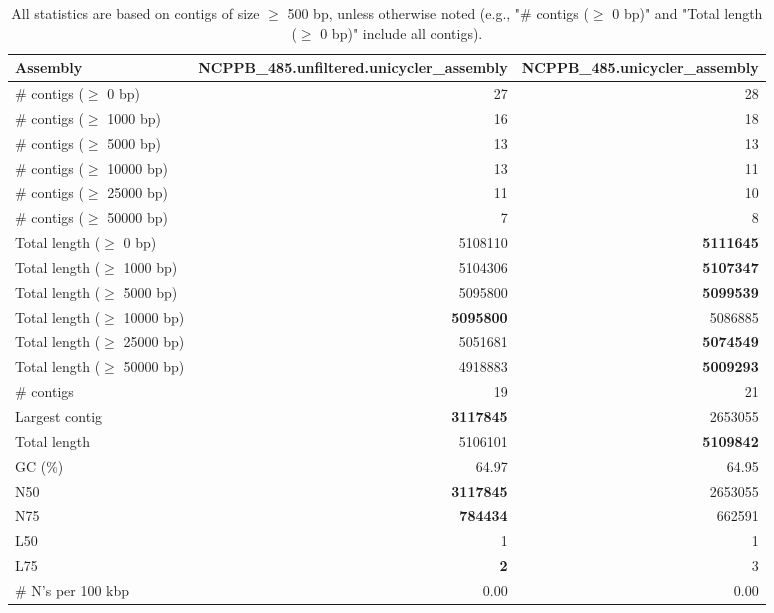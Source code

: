 \documentclass[12pt,a4paper]{article}
\begin{document}
\begin{table}[ht]
\begin{center}
\caption{All statistics are based on contigs of size $\geq$ 500 bp, unless otherwise noted (e.g., "\# contigs ($\geq$ 0 bp)" and "Total length ($\geq$ 0 bp)" include all contigs).}
\begin{tabular}{|l*{2}{|r}|}
\hline
Assembly & NCPPB\_485.unfiltered.unicycler\_assembly & NCPPB\_485.unicycler\_assembly \\ \hline
\# contigs ($\geq$ 0 bp) & 27 & 28 \\ \hline
\# contigs ($\geq$ 1000 bp) & 16 & 18 \\ \hline
\# contigs ($\geq$ 5000 bp) & 13 & 13 \\ \hline
\# contigs ($\geq$ 10000 bp) & 13 & 11 \\ \hline
\# contigs ($\geq$ 25000 bp) & 11 & 10 \\ \hline
\# contigs ($\geq$ 50000 bp) & 7 & 8 \\ \hline
Total length ($\geq$ 0 bp) & 5108110 & {\bf 5111645} \\ \hline
Total length ($\geq$ 1000 bp) & 5104306 & {\bf 5107347} \\ \hline
Total length ($\geq$ 5000 bp) & 5095800 & {\bf 5099539} \\ \hline
Total length ($\geq$ 10000 bp) & {\bf 5095800} & 5086885 \\ \hline
Total length ($\geq$ 25000 bp) & 5051681 & {\bf 5074549} \\ \hline
Total length ($\geq$ 50000 bp) & 4918883 & {\bf 5009293} \\ \hline
\# contigs & 19 & 21 \\ \hline
Largest contig & {\bf 3117845} & 2653055 \\ \hline
Total length & 5106101 & {\bf 5109842} \\ \hline
GC (\%) & 64.97 & 64.95 \\ \hline
N50 & {\bf 3117845} & 2653055 \\ \hline
N75 & {\bf 784434} & 662591 \\ \hline
L50 & 1 & 1 \\ \hline
L75 & {\bf 2} & 3 \\ \hline
\# N's per 100 kbp & 0.00 & 0.00 \\ \hline
\end{tabular}
\end{center}
\end{table}
\end{document}
